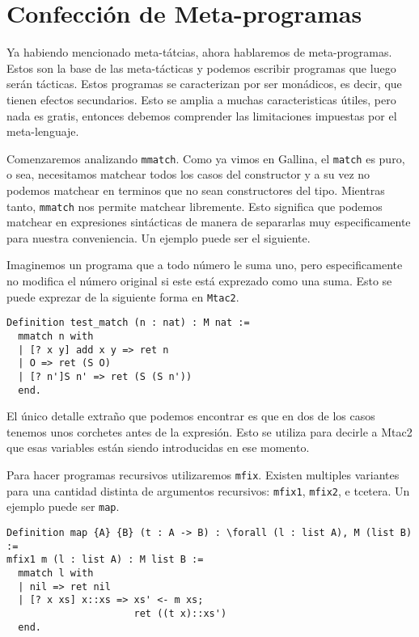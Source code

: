 \section{Confección de Meta-programas}
Ya habiendo mencionado meta-tátcias, ahora hablaremos de meta-programas. Estos son la base de las meta-tácticas y podemos escribir programas que luego serán tácticas. Estos programas se caracterizan por ser monádicos, es decir, que tienen efectos secundarios. Esto se amplia a muchas caracteristicas útiles, pero nada es gratis, entonces debemos comprender las limitaciones impuestas por el meta-lenguaje.

Comenzaremos analizando \lstinline{mmatch}. Como ya vimos en Gallina, el \lstinline{match} es puro, o sea, necesitamos matchear todos los casos del constructor y a su vez no podemos matchear en terminos que no sean constructores del tipo. Mientras tanto, \lstinline{mmatch} nos permite matchear libremente. Esto significa que podemos matchear en expresiones sintácticas de manera de separarlas muy especificamente para nuestra conveniencia. Un ejemplo puede ser el siguiente.

Imaginemos un programa que a todo número le suma uno, pero especificamente no modifica el número original si este está exprezado como una suma. Esto se puede exprezar de la siguiente forma en \lstinline{Mtac2}.
\begin{lstlisting}
Definition test_match (n : nat) : M nat :=
  mmatch n with
  | [? x y] add x y => ret n
  | O => ret (S O)
  | [? n']S n' => ret (S (S n'))
  end.
\end{lstlisting}

El único detalle extraño que podemos encontrar es que en dos de los casos tenemos unos corchetes antes de la expresión. Esto se utiliza para decirle a Mtac2 que esas variables están siendo introducidas en ese momento.

Para hacer programas recursivos utilizaremos \lstinline{mfix}. Existen multiples variantes para una cantidad distinta de argumentos recursivos: \lstinline{mfix1}, \lstinline{mfix2}, e
tcetera.
Un ejemplo puede ser \lstinline{map}.
\begin{lstlisting}
Definition map {A} {B} (t : A -> B) : \forall (l : list A), M (list B) :=
mfix1 m (l : list A) : M list B :=
  mmatch l with
  | nil => ret nil
  | [? x xs] x::xs => xs' <- m xs;
                      ret ((t x)::xs')
  end.
\end{lstlisting}

